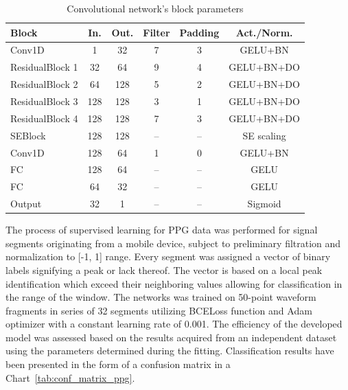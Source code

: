 \documentclass[journal]{IEEEtran}
\begin{document}
\begin{table}[ht]
\centering
\caption{Convolutional network's block parameters}
\label{tab:ppg_layers}
\begin{tabular}{|l|c|c|c|c|c|}
\hline
\textbf{Block} & \textbf{In.} & \textbf{Out.} & \textbf{Filter} & \textbf{Padding} & \textbf{Act./Norm.} \\
\hline
Conv1D & 1 & 32 & 7 & 3 & GELU+BN \\
ResidualBlock 1 & 32 & 64 & 9 & 4 & GELU+BN+DO \\
ResidualBlock 2 & 64 & 128 & 5 & 2 & GELU+BN+DO \\
ResidualBlock 3 & 128 & 128 & 3 & 1 & GELU+BN+DO\\
ResidualBlock 4 & 128 & 128 & 7 & 3 & GELU+BN+DO \\
SEBlock & 128 & 128 & – & – & SE scaling \\
Conv1D  & 128 & 64 & 1 & 0 & GELU+BN \\
FC & 128 & 64 & – & – & GELU \\
FC & 64 & 32 & – & – & GELU \\
Output & 32 & 1 & – & – & Sigmoid \\
\hline
\end{tabular}
\end{table}

The process of supervised learning for PPG data was performed for signal segments originating from a mobile device, subject to preliminary filtration and normalization to [-1, 1] range. Every segment was assigned a vector of binary labels signifying a peak or lack thereof. The vector is based on a local peak identification which exceed their neighboring values allowing for classification in the range of the window. The networks was trained on 50-point waveform fragments in series of 32 segments utilizing BCELoss function and Adam optimizer with a constant learning rate of 0.001. The efficiency of the developed model was assessed based on the results acquired from an independent dataset using the parameters determined during the fitting. Classification results have been presented in the form of a confusion matrix in a Chart~\ref{tab:conf_matrix_ppg}.
\end{document}
